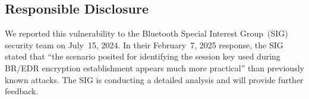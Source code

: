 \subsection{Responsible Disclosure}

We reported this vulnerability to the Bluetooth Special Interest Group~(SIG) security team on July~15, 2024.
In their February~7, 2025 response, the SIG stated that ``the scenario posited for identifying the session key used during BR/EDR encryption establishment appears much more practical'' than previously known attacks.
The SIG is conducting a detailed analysis and will provide further feedback.

